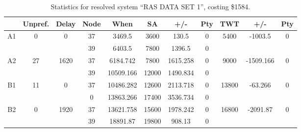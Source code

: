 \begin{sidewaystable}
\footnotesize
\caption{Statistics for resolved system ``RAS DATA SET 1'', costing \$1584.}
\centering
\begin{tabular}{c||c|c||c|c|c|c|c||c|c|c}
  \hline \hline
  &
  Unpref. & 
  Delay &
  Node &
  When &
  SA &
  +/- &
  Pty &
  TWT &
  +/- &
  Pty \\
      \hline
      \multirow{2}{*}{A1} &
      \multirow{2}{*}{0} &
      \multirow{2}{*}{0} &
      37 &
      3469.5 &
      3600 &
        130.5 &
        0 &
      \multirow{2}{*}{5400} &
        \multirow{2}{*}{-1003.5} &
        \multirow{2}{*}{0}
      \\
      \cline{4-8}
       &
       &
       &
      39 &
      6403.5 &
      7800 &
        1396.5 &
        0 &
      
         &
        
      \\
      \hline
      \multirow{2}{*}{A2} &
      \multirow{2}{*}{27} &
      \multirow{2}{*}{1620} &
      37 &
      6184.742 &
      7800 &
        1615.258 &
        0 &
      \multirow{2}{*}{9000} &
        \multirow{2}{*}{-1509.166} &
        \multirow{2}{*}{0}
      \\
      \cline{4-8}
       &
       &
       &
      39 &
      10509.166 &
      12000 &
        1490.834 &
        0 &
      
         &
        
      \\
      \hline
      \multirow{2}{*}{B1} &
      \multirow{2}{*}{11} &
      \multirow{2}{*}{0} &
      37 &
      10486.282 &
      12600 &
        2113.718 &
        0 &
      \multirow{2}{*}{13800} &
        \multirow{2}{*}{-63.266} &
        \multirow{2}{*}{0}
      \\
      \cline{4-8}
       &
       &
       &
      0 &
      13863.266 &
      17400 &
        3536.734 &
        0 &
      
         &
        
      \\
      \hline
      \multirow{2}{*}{B2} &
      \multirow{2}{*}{0} &
      \multirow{2}{*}{1920} &
      37 &
      13621.758 &
      15600 &
        1978.242 &
        0 &
      \multirow{2}{*}{16800} &
        \multirow{2}{*}{-2091.87} &
        \multirow{2}{*}{0}
      \\
      \cline{4-8}
       &
       &
       &
      39 &
      18891.87 &
      19800 &
        908.13 &
        0 &
      

\end{tabular}
\end{sidewaystable}
